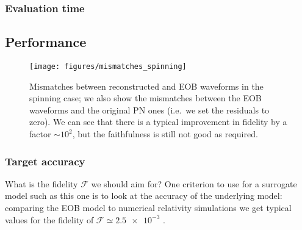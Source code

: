 \documentclass[main.tex]{subfiles}
\begin{document}


\subsubsection{Evaluation time} \label{sec:evaluation-time}



\subsection{Performance} \label{sec:performance}

\begin{figure}[ht]
\centering
\texttt{[image: figures/mismatches\_spinning]}
\caption{Mismatches between reconstructed and \ac{EOB} waveforms in the spinning case; we also show the mismatches between the \ac{EOB} waveforms and the original \ac{PN} ones (i.e.\ we set the residuals to zero). We can see that there is a typical improvement in fidelity by a factor \(\sim 10^2\), but the faithfulness is still not good as required.}
\label{fig:mismatches_spinning}
\end{figure}

\subsubsection{Target accuracy}

What is the fidelity \(\mathcal{F}\) we should aim for? 
One criterion to use for a surrogate model such as this one is to look at the accuracy of the underlying model: comparing the \ac{EOB} model to numerical relativity simulations we get typical values for the fidelity of \(\mathcal{F} \simeq \num{2.5e-3}\) \cite[]{nagarTimedomainEffectiveonebodyGravitational2018}.
\end{document}

